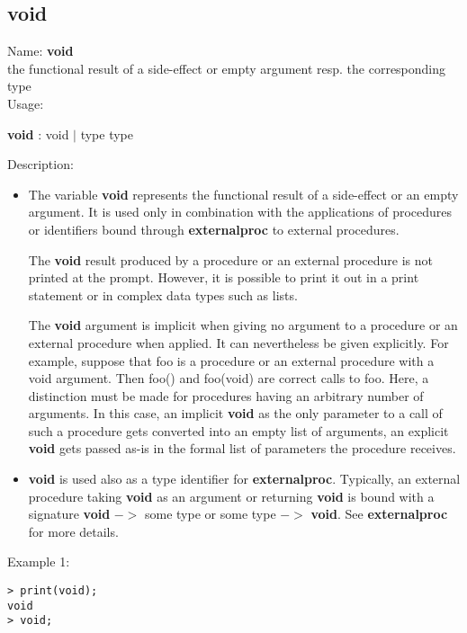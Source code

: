 \subsection{void}
\label{labvoid}
\noindent Name: \textbf{void}\\
the functional result of a side-effect or empty argument resp. the corresponding type\\
\noindent Usage: 
\begin{center}
\textbf{void} : \textsf{void} $|$ \textsf{type type}\\
\end{center}
\noindent Description: \begin{itemize}

\item The variable \textbf{void} represents the functional result of a
   side-effect or an empty argument.  It is used only in combination with
   the applications of procedures or identifiers bound through
   \textbf{externalproc} to external procedures.
    
   The \textbf{void} result produced by a procedure or an external procedure
   is not printed at the prompt. However, it is possible to print it out
   in a print statement or in complex data types such as lists.
    
   The \textbf{void} argument is implicit when giving no argument to a
   procedure or an external procedure when applied. It can nevertheless be given
   explicitly.  For example, suppose that foo is a procedure or an
   external procedure with a void argument. Then foo() and foo(void) are
   correct calls to foo. Here, a distinction must be made for procedures having an
   arbitrary number of arguments. In this case, an implicit \textbf{void}
   as the only parameter to a call of such a procedure gets converted into 
   an empty list of arguments, an explicit \textbf{void} gets passed as-is in the
   formal list of parameters the procedure receives.

\item \textbf{void} is used also as a type identifier for
   \textbf{externalproc}. Typically, an external procedure taking \textbf{void} as an
   argument or returning \textbf{void} is bound with a signature \textbf{void} $->$
   some type or some type $->$ \textbf{void}. See \textbf{externalproc} for more
   details.
\end{itemize}
\noindent Example 1: 
\begin{center}\begin{minipage}{15cm}\begin{Verbatim}[frame=single]
> print(void);
void
> void;
\end{Verbatim}
\end{minipage}\end{center}
